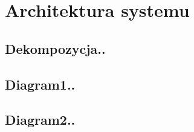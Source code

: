 \section{Architektura systemu}

\subsection{Dekompozycja..}
\subsection{Diagram1..}
\subsection{Diagram2..}
